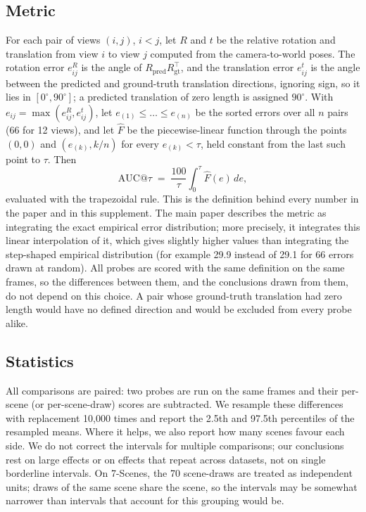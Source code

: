 \documentclass[10pt,twocolumn,letterpaper]{article}
\begin{document}
\subsection{Metric}
For each pair of views $(i,j)$, $i<j$, let $R$ and $t$ be the relative rotation and translation from view $i$ to view $j$ computed from the camera-to-world poses. The rotation error $e^R_{ij}$ is the angle of $R_{\mathrm{pred}}R_{\mathrm{gt}}^\top$, and the translation error $e^t_{ij}$ is the angle between the predicted and ground-truth translation directions, ignoring sign, so it lies in $[0^\circ,90^\circ]$; a predicted translation of zero length is assigned $90^\circ$. With $e_{ij}=\max(e^R_{ij},e^t_{ij})$, let $e_{(1)}\le\dots\le e_{(n)}$ be the sorted errors over all $n$ pairs (66 for 12 views), and let $\hat F$ be the piecewise-linear function through the points $(0,0)$ and $(e_{(k)},k/n)$ for every $e_{(k)}<\tau$, held constant from the last such point to $\tau$. Then
\begin{equation}
  \mathrm{AUC@}\tau \;=\; \frac{100}{\tau}\int_0^{\tau} \hat F(e)\,de ,
\end{equation}
evaluated with the trapezoidal rule. This is the definition behind every number in the paper and in this supplement. The main paper describes the metric as integrating the exact empirical error distribution; more precisely, it integrates this linear interpolation of it, which gives slightly higher values than integrating the step-shaped empirical distribution (for example 29.9 instead of 29.1 for 66 errors drawn at random). All probes are scored with the same definition on the same frames, so the differences between them, and the conclusions drawn from them, do not depend on this choice. A pair whose ground-truth translation had zero length would have no defined direction and would be excluded from every probe alike.

\subsection{Statistics}
All comparisons are paired: two probes are run on the same frames and their per-scene (or per-scene-draw) scores are subtracted. We resample these differences with replacement 10{,}000 times and report the 2.5th and 97.5th percentiles of the resampled means. Where it helps, we also report how many scenes favour each side. We do not correct the intervals for multiple comparisons; our conclusions rest on large effects or on effects that repeat across datasets, not on single borderline intervals. On 7-Scenes, the 70 scene-draws are treated as independent units; draws of the same scene share the scene, so the intervals may be somewhat narrower than intervals that account for this grouping would be.
\end{document}
